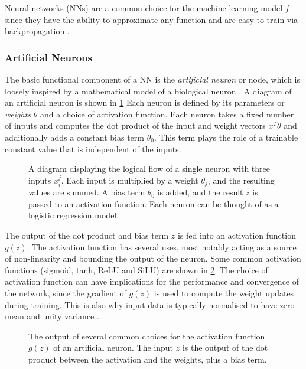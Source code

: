 Neural networks (NNs) are a common choice for the machine learning model $f$ since they have the ability to approximate any function \cite{HORNIK1989359} and are easy to train via backpropagation \cite{rumelhart1986learning}.

\subsubsection{Artificial Neurons}

The basic functional component of a NN is the \textit{artificial neuron} or node, which is loosely inspired by a mathematical model of a biological neuron \cite{mcculloch1943logical, hopfield1987neural}.
A diagram of an artificial neuron is shown in \cref{fig:neuron}
Each neuron is defined by its parameters or \textit{weights} $\theta$ and a choice of activation function.
Each neuron takes a fixed number of inputs and computes the dot product of the input and weight vectors $x^T \theta$ and additionally adds a constant bias term $\theta_0$.
This term plays the role of a trainable constant value that is independent of the inputs.

\begin{figure}[!htbp]
    \centering
    
    \caption{
      A diagram displaying the logical flow of a single neuron with three inputs $x_i^j$.
      Each input is multiplied by a weight $\theta_j$, and the resulting values are summed.
      A bias term $\theta_0$ is added, and the result $z$ is passed to an activation function.
      Each neuron can be thought of as a logistic regression model.
    }
    \label{fig:neuron}
\end{figure}

The output of the dot product and bias term $z$ is fed into an activation function $g(z)$.
The activation function has several uses, most notably acting as a source of non-linearity and bounding the output of the neuron.
Some common activation functions (sigmoid, tanh, ReLU and SiLU) \cite{2018arXiv180308375A,2017arXiv170203118E} are shown in \cref{fig:activation_functions}.
The choice of activation function can have implications for the performance and convergence of the network, since the gradient of $g(z)$ is used to compute the weight updates during training.
This is also why input data is typically normalised to have zero mean and unity variance \cite{lecun2012efficient}.

\begin{figure}[!htbp]
  \centering
  
  \caption{
    The output of several common choices for the activation function $g(z)$ of an artificial neuron.
    The input $z$ is the output of the dot product between the activation and the weights, plus a bias term.
  }
  \label{fig:activation_functions}
\end{figure}


